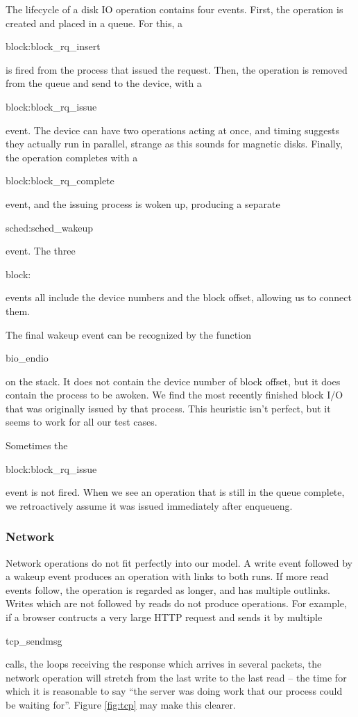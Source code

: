 \documentclass[10pt]{article}
\begin{document}
The lifecycle of a disk IO operation contains four events.  First, the operation is created and placed in a queue.  For this, a \begin{tt}block:block\_rq\_insert\end{tt} is fired from the process that issued the request.  Then, the operation is removed from the queue and send to the device, with a \begin{tt}block:block\_rq\_issue\end{tt} event.  The device can have two operations acting at once, and timing suggests they actually run in parallel, strange as this sounds for magnetic disks.  Finally, the operation completes with a \begin{tt}block:block\_rq\_complete\end{tt} event, and the issuing process is woken up, producing a separate \begin{tt}sched:sched\_wakeup\end{tt} event.  The three \begin{tt}block:\end{tt} events all include the device numbers and the block offset, allowing us to connect them.

The final wakeup event can be recognized by the function \begin{tt}bio\_endio\end{tt} on the stack.  It does not contain the device number of block offset, but it does contain the process to be awoken.  We find the most recently finished block I/O that was originally issued by that process.  This heuristic isn't perfect, but it seems to work for all our test cases.

Sometimes the \begin{tt}block:block\_rq\_issue\end{tt} event is not fired.  When we see an operation that is still in the queue complete, we retroactively assume it was issued immediately after enqueueng.

\subsubsection{Network}

Network operations do not fit perfectly into our model.  A write event followed by a wakeup event produces an operation with links to both runs.  If more read events follow, the operation is regarded as longer, and has multiple outlinks.  Writes which are not followed by reads do not produce operations.  For example, if a browser contructs a very large HTTP request and sends it by multiple \begin{tt}tcp\_sendmsg\end{tt} calls, the loops receiving the response which arrives in several packets, the network operation will stretch from the last write to the last read -- the time for which it is reasonable to say ``the server was doing work that our process could be waiting for''.  Figure \ref{fig:tcp} may make this clearer. 
\end{document}
